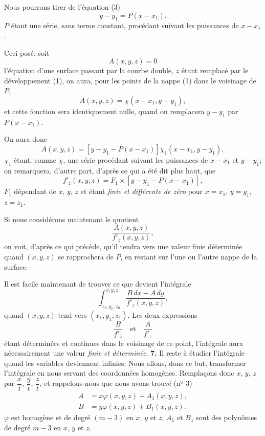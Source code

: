 \documentclass{article}
\begin{document}
Nous pourrons tirer de l'équation (3)
\[
y - y_{1} = P(x - x_{1}).
\]
$P$ étant une série, sans terme constant, procédant suivant les puissances de $x - x_{1}$.

Ceci posé, soit
\[
A(x, y, z) = 0
\]
l'équation d'une surface passant par la courbe double, $z$ étant remplacé
par le développement (1), on aura, pour les points de la nappe (1) dans le voisinage de $P$,
\[
A(x, y, z) = \chi(x - x_{1}, y - y_{1}),
\]
et cette fonction sera identiquement nulle, quand on remplacera $y - y_{1}$ par $P(x - x_{1})$.

On aura donc
\[
A(x, y, z) = [y - y_{1} - P(x - x_{1})]\chi_{1}(x - x_{1}, y - y_{1}),
\]
$\chi_{1}$ étant, comme $\chi$, une série procédant suivant les puissances de $x - x_{1}$ et $y - y_{1}$; on remarquera, d'autre part, d'après ce qui a été dit plus haut, que
\[
f'_{z}(x, y, z) = F_{1} \times [y - y_{1} - P(x - x_{1})],
\]
$F_{1}$ dépendant de $x$, $y$, $z$ et étant \emph{finie et différente de zéro} pour $x = x_{1}$, $y = y_{1}$, $z = z_{1}$.

Si nous considérons maintenant le quotient
\[
\frac{A(x, y, z)}{f'_{z}(x, y, z)},
\]
on voit, d'après ce qui précède, qu'il tendra vers une valeur finie déterminée quand $(x, y, z)$ se rapprochera de $P$, en restant sur l'une ou l'autre nappe de la surface.

Il est facile maintenant de trouver ce que devient l'intégrale
\[
\int_{x_{0}, y_{0}, z_{0}}^{x, y, z} \frac{B\,dx - A\,dy}{f'_{z}(x, y, z)},
\]
quand $(x, y, z)$ tend vers $(x_{1}, y_{1}, z_{1})$. Les deux expressions
\[
\frac{B}{f'_{z}} \quad \text{et} \quad \frac{A}{f'_{z}}
\]
étant déterminées et continues dans le voisinage de ce point, l'intégrale aura nécessairement une valeur \emph{finie et déterminée}.
\textbf{7.} Il reste à étudier l'intégrale quand les variables deviennent infinies. Nous allons, dans ce but, transformer l'intégrale en nous servant des coordonnées homogènes. Remplaçons donc $x$, $y$, $z$ par $\dfrac{x}{t}$, $\dfrac{y}{t}$, $\dfrac{z}{t}$, et rappelons-nous que nous avons trouvé (nº 3)
\[
\begin{aligned}
A &= x\varphi(x, y, z) + A_{1}(x, y, z), \\
B &= y\varphi(x, y, z) + B_{1}(x, y, z).
\end{aligned}
\]
$\varphi$ est homogène et de degré $(m - 3)$ en $x$, $y$ et $z$; $A_{1}$ et $B_{1}$ sont des polynômes de degré $m - 3$ en $x$, $y$ et $z$.
\end{document}
